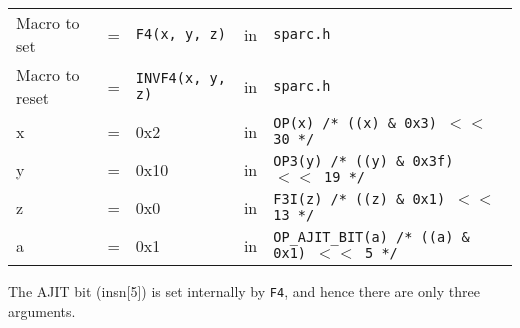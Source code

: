 \begin{enumerate}
  \begin{tabular}[h]{lclcl}
    Macro to set  &=& \texttt{F4(x, y, z)} &in& \texttt{sparc.h}     \\
    Macro to reset  &=& \texttt{INVF4(x, y, z)} &in& \texttt{sparc.h}     \\
    x &=& 0x2      &in& \texttt{OP(x)  /* ((x) \& 0x3)  $<<$ 30 */} \\
    y &=& 0x10     &in& \texttt{OP3(y) /* ((y) \& 0x3f) $<<$ 19 */} \\
    z &=& 0x0      &in& \texttt{F3I(z) /* ((z) \& 0x1)  $<<$ 13 */} \\
    a &=& 0x1      &in& \texttt{OP\_AJIT\_BIT(a) /* ((a) \& 0x1)  $<<$ 5 */}
  \end{tabular}

  The AJIT bit  (insn[5]) is set internally by  \texttt{F4}, and hence
  there are only three arguments.


\end{enumerate}
